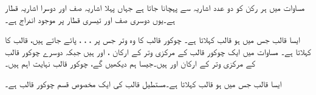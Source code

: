 مساوات  میں ہر رکن کو دو عدد اشاریہ سے پہچانا جاتا ہے جہاں پہلا اشاریہ صف اور دوسرا اشاریہ قطار ہے۔یوں  دوسری  صف اور تیسری  قطار پر موجود اندراج ہے۔

ایسا قالب جس میں  ہو   قالب کہلاتا ہے۔ چوکور قالب کا وہ وتر جس پر ، ، ،  پائے جاتے ہیں، قالب کا  کہلاتا ہے۔ مساوات  میں ایک چوکور قالب کے مرکزی وتر کے ارکان ،  اور  ہیں جبکہ دوسرے چوکور قالب کے مرکزی وتر کے ارکان  اور  ہیں۔جیسا ہم دیکھیں گے، چوکور قالب نہایت اہم ہیں۔

ایسا قالب جس میں  ہو   قالب کہلاتا ہے۔مستطیل قالب کی ایک مخصوص قسم چوکور قالب ہے۔

